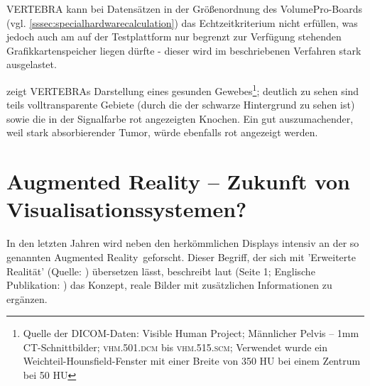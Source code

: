 \documentclass[ngerman,pdftex,paper=A4,DIV=calc,titlepage,12pt]{scrartcl}
\newtheorem[L]{boxedDefinition}{Definition}
\begin{document}
VERTEBRA kann bei Datensätzen in der Größenordnung des VolumePro-Boards (vgl. \ref{sssec:specialhardwarecalculation}) das Echtzeitkriterium nicht erfüllen, was jedoch auch am auf der Testplattform nur begrenzt zur Verfügung stehenden Grafikkartenspeicher liegen dürfte - dieser wird im beschriebenen Verfahren stark ausgelastet.

 zeigt VERTEBRAs Darstellung eines gesunden Gewebes\footnote{Quelle der DICOM-Daten: Visible Human Project; Männlicher Pelvis -- 1mm CT-Schnittbilder; \textsc{vhm.501.dcm} bis \textsc{vhm.515.scm}; Verwendet wurde ein Weichteil-Hounsfield-Fenster mit einer Breite von 350 HU bei einem Zentrum bei 50 HU}; deutlich zu sehen sind teils volltransparente Gebiete (durch die der schwarze Hintergrund zu sehen ist) sowie die in der Signalfarbe rot angezeigten Knochen. Ein gut auszumachender, weil stark absorbierender Tumor, würde ebenfalls rot angezeigt werden.
\enlargethispage{2\baselineskip}

\section{Augmented Reality -- Zukunft von Visualisationssystemen?}\label{sec:augmentedreality}
In den letzten Jahren wird neben den herkömmlichen Displays intensiv an der so genannten \glqq Augmented Reality\grqq\ geforscht. Dieser Begriff, der sich mit 'Erweiterte Realität' (Quelle: \cite[Seite 1]{Toe2010}) übersetzen lässt, beschreibt laut \cite{Suthau2002DE} (Seite 1; Englische Publikation: \cite{Suthau2002}) das Konzept, reale Bilder mit zusätzlichen Informationen zu ergänzen.
\end{document}
